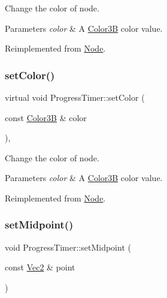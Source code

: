 Change the color of node. 
\begin{DoxyParams}{Parameters}
{\em color} & A \hyperlink{structColor3B}{Color3B} color value. \\
\hline
\end{DoxyParams}


Reimplemented from \hyperlink{classNode_af45037de5b13602263b1ce51b50cafdd}{Node}.

\mbox{\label{classProgressTimer_a3cd315f15a68b541ab276648fa5803cf}} 
\subsubsection{\texorpdfstring{set\+Color()}{setColor()}\hspace{0.1cm}{\footnotesize\ttfamily [2/2]}}
{\footnotesize\ttfamily virtual void Progress\+Timer\+::set\+Color (\begin{DoxyParamCaption}\item[{const \hyperlink{structColor3B}{Color3B} \&}]{color }\end{DoxyParamCaption})\hspace{0.3cm}{\ttfamily [override]}, {\ttfamily [virtual]}}

Change the color of node. 
\begin{DoxyParams}{Parameters}
{\em color} & A \hyperlink{structColor3B}{Color3B} color value. \\
\hline
\end{DoxyParams}


Reimplemented from \hyperlink{classNode_af45037de5b13602263b1ce51b50cafdd}{Node}.

\mbox{\label{classProgressTimer_a69680f76df01ea815970964cc1dc673b}} 
\subsubsection{\texorpdfstring{set\+Midpoint()}{setMidpoint()}\hspace{0.1cm}{\footnotesize\ttfamily [1/2]}}
{\footnotesize\ttfamily void Progress\+Timer\+::set\+Midpoint (\begin{DoxyParamCaption}\item[{const \hyperlink{classVec2}{Vec2} \&}]{point }\end{DoxyParamCaption})}

